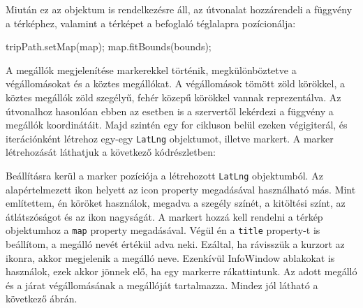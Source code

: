 
Miután ez az objektum is rendelkezésre áll, az útvonalat hozzárendeli a függvény a térképhez, valamint a térképet a befoglaló téglalapra pozícionálja:

\begin{cpp}
tripPath.setMap(map);
map.fitBounds(bounds);
\end{cpp}

A megállók megjelenítése markerekkel történik, megkülönböztetve a végállomásokat és a köztes megállókat. A végállomások tömött zöld körökkel, a köztes megállók zöld szegélyű, fehér közepű körökkel vannak reprezentálva. Az útvonalhoz hasonlóan ebben az esetben is a szervertől lekérdezi a függvény a megállók koordinátáit. Majd szintén egy for cikluson belül ezeken végigiterál, és iterációnként létrehoz egy-egy \texttt{LatLng} objektumot, illetve markert. A marker létrehozását láthatjuk a következő kódrészletben:


Beállításra kerül a marker pozíciója a létrehozott \texttt{LatLng} objektumból. Az alapértelmezett ikon helyett az icon property megadásával használható más. Mint említettem, én köröket használok, megadva a szegély színét, a kitöltési színt, az átlátszóságot és az ikon nagyságát. A markert hozzá kell rendelni a térkép objektumhoz a \texttt{map} property megadásával. Végül én a \texttt{title} property-t is beállítom, a megálló nevét értékül adva neki. Ezáltal, ha rávisszük a kurzort az ikonra, akkor megjelenik a megálló neve. Ezenkívül InfoWindow ablakokat is használok, ezek akkor jönnek elő, ha egy markerre rákattintunk. Az adott megálló és a járat végállomásának a megállóját tartalmazza. Mindez jól látható a következő ábrán.

